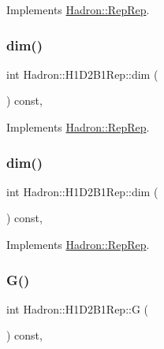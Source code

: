 Implements \mbox{\hyperlink{structHadron_1_1RepRep_a92c8802e5ed7afd7da43ccfd5b7cd92b}{Hadron\+::\+Rep\+Rep}}.

\mbox{\label{structHadron_1_1H1D2B1Rep_a0b9935c70773e15e4494ab8f09eb29c7}} 
\subsubsection{\texorpdfstring{dim()}{dim()}\hspace{0.1cm}{\footnotesize\ttfamily [2/3]}}
{\footnotesize\ttfamily int Hadron\+::\+H1\+D2\+B1\+Rep\+::dim (\begin{DoxyParamCaption}{ }\end{DoxyParamCaption}) const\hspace{0.3cm}{\ttfamily [inline]}, {\ttfamily [virtual]}}



Implements \mbox{\hyperlink{structHadron_1_1RepRep_a92c8802e5ed7afd7da43ccfd5b7cd92b}{Hadron\+::\+Rep\+Rep}}.

\mbox{\label{structHadron_1_1H1D2B1Rep_a0b9935c70773e15e4494ab8f09eb29c7}} 
\subsubsection{\texorpdfstring{dim()}{dim()}\hspace{0.1cm}{\footnotesize\ttfamily [3/3]}}
{\footnotesize\ttfamily int Hadron\+::\+H1\+D2\+B1\+Rep\+::dim (\begin{DoxyParamCaption}{ }\end{DoxyParamCaption}) const\hspace{0.3cm}{\ttfamily [inline]}, {\ttfamily [virtual]}}



Implements \mbox{\hyperlink{structHadron_1_1RepRep_a92c8802e5ed7afd7da43ccfd5b7cd92b}{Hadron\+::\+Rep\+Rep}}.

\mbox{\label{structHadron_1_1H1D2B1Rep_aa63b64ca5dfe557c9ea319ed68580acd}} 
\subsubsection{\texorpdfstring{G()}{G()}\hspace{0.1cm}{\footnotesize\ttfamily [1/2]}}
{\footnotesize\ttfamily int Hadron\+::\+H1\+D2\+B1\+Rep\+::G (\begin{DoxyParamCaption}{ }\end{DoxyParamCaption}) const\hspace{0.3cm}{\ttfamily [inline]}, {\ttfamily [virtual]}}

